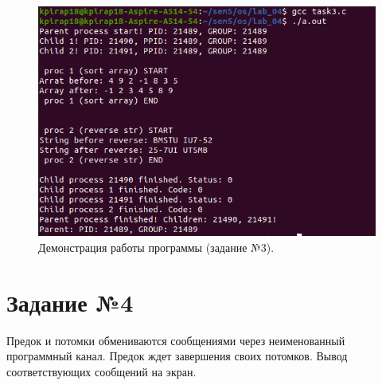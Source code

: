 \documentclass[12pt]{report}
\begin{document}
\begin{figure}[H]

	\centering

	\includegraphics[width=\linewidth]{img/p3.png}
	\caption{Демонстрация работы программы (задание №3).}

	\label{fig:p3}

\end{figure}

\section*{Задание №4}

Предок и потомки обмениваются сообщениями через неименованный
программный канал. Предок ждет завершения своих потомков. Вывод соответствующих сообщений на экран.
\end{document}
